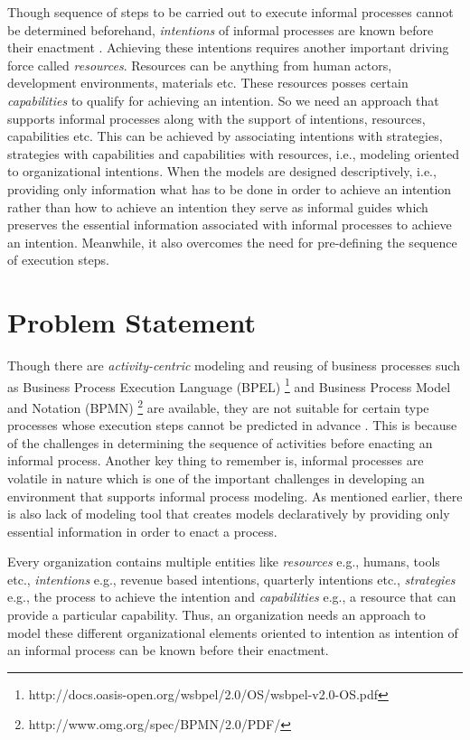Though sequence of steps to be carried out to execute informal processes cannot be determined beforehand, \textit{intentions} of informal processes are known before their enactment \cite{Sungur2015}. Achieving these intentions requires another important driving force called \textit{resources}. Resources can be anything from human actors, development environments, materials etc. These resources posses certain \textit{capabilities} to qualify for achieving an intention. So we need an approach that supports informal processes along with the support of intentions, resources, capabilities etc. This can be achieved by associating intentions with strategies, strategies with capabilities and capabilities with resources, i.e., modeling oriented to organizational intentions. When the models are designed descriptively, i.e., providing only information what has to be done in order to achieve an intention rather than how to achieve an intention they serve as informal guides which preserves the essential information associated with informal processes to achieve an intention. Meanwhile, it also overcomes the need for pre-defining the sequence of execution steps.

\section{Problem Statement}
\label{sec:problemstatement}
Though there are \textit{activity-centric} modeling and reusing of business processes such as Business Process Execution Language (BPEL) \footnote{http://docs.oasis-open.org/wsbpel/2.0/OS/wsbpel-v2.0-OS.pdf} and Business Process Model and Notation (BPMN) \footnote{http://www.omg.org/spec/BPMN/2.0/PDF/} are available, they are not suitable for certain type processes whose execution steps cannot be predicted in advance \cite{Sungur2014a}. This is because of the challenges in determining the sequence of activities before enacting an informal process. Another key thing to remember is, informal processes are volatile in nature which is one of the important challenges in developing an environment that supports informal process modeling. As mentioned earlier, there is also lack of modeling tool that creates models declaratively by providing only essential information in order to enact a process. 

Every organization contains multiple entities like \textit{resources} e.g., humans, tools etc., \textit{intentions} e.g., revenue based intentions, quarterly intentions etc., \textit{strategies} e.g., the process to achieve the intention and \textit{capabilities} e.g., a resource that can provide a particular capability. Thus, an organization needs an approach to model these different organizational elements oriented to intention as intention of an informal process can be known before their enactment.

